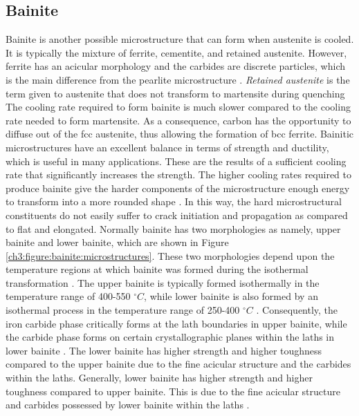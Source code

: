 \documentclass[12pt]{report}
\begin{document}
\subsection{Bainite}
Bainite is another possible microstructure that can form when austenite is cooled. It is typically the mixture of ferrite, cementite, and retained austenite. However, ferrite has an acicular morphology and the carbides are discrete particles, which is the main difference from the pearlite microstructure \cite{molabe2018determining}. \emph{Retained austenite} is the term given to austenite that does not transform to martensite during quenching \cite{bajaj2020steels} The cooling rate required to form bainite is much slower compared to the cooling rate needed to form martensite. As a consequence, carbon has the opportunity to diffuse out of the fcc austenite, thus allowing the formation of bcc ferrite.  
Bainitic microstructures have an excellent balance in terms of strength and ductility, which is useful in many applications. These are the results of a sufficient cooling rate that significantly increases the strength. The higher cooling rates required to produce bainite give the harder components of the microstructure enough energy to transform into a more rounded shape \cite{bajaj2020steels}. In this way, the hard microstructural constituents do not easily suffer to crack initiation and propagation as compared to flat and elongated.
Normally bainite has two morphologies as namely, upper bainite and lower bainite, which are shown in Figure \ref{ch3:figure:bainite:microstructures}. These two morphologies depend upon the temperature regions at which bainite was formed during the isothermal transformation \cite{molabe2018determining}. The upper bainite is typically formed isothermally in the temperature range of 400-550 $^\circ C$, while lower bainite is also formed by an isothermal process in the temperature range of 250-400 $^\circ C$ \cite{molabe2018determining}. Consequently, the iron carbide phase critically forms at the lath boundaries in upper bainite, while the carbide phase forms on certain crystallographic planes within the laths in lower bainite \cite{bajaj2020steels}. The lower bainite has higher strength and higher toughness compared to the upper bainite due to the fine acicular structure and the carbides within the laths. Generally, lower bainite has higher strength and higher toughness compared to upper bainite. This is due to the fine acicular structure and carbides possessed by lower bainite within the laths \cite{molabe2018determining}.
     
\end{document}
